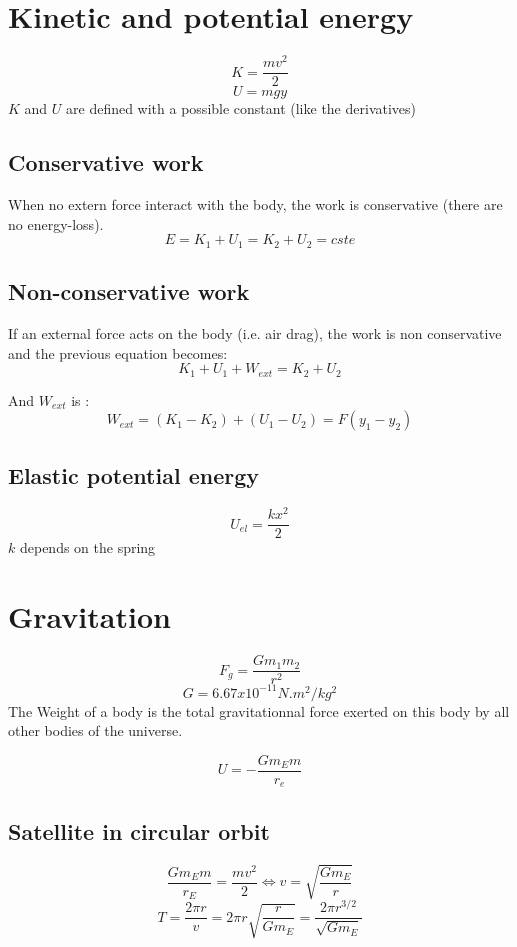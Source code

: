 \documentclass[a4paper,10pt]{article}
\begin{document}
\section{Kinetic and potential energy}
\[K = \frac{mv^2}{2}\]
\[U = mgy\]
$K$ and $U$ are defined with a possible constant (like the derivatives)

\subsection{Conservative work}
When no extern force interact with the body, the work is conservative (there are no energy-loss).
\[E = K_1 + U_1 = K_2 + U_2 = cste \]

\subsection{Non-conservative work}
If an external force acts on the body (i.e. air drag), the work is non conservative and the previous equation becomes:
\[K_1 + U_1 + W_{ext} = K_2 + U_2\]

And $W_{ext}$ is :
\[W_{ext} = (K_1 - K_2) + (U_1 - U_2) = F(y_1 - y_2)\]

\subsection{Elastic potential energy}
\[U_{el} = \frac{kx^2}{2}\]
$k$ depends on the spring

\section{Gravitation}
\[F_g = \frac{Gm_1m_2}{r^2}\]
\[G = 6.67x10^{-11} N.m^2/kg^2\]
The Weight of a body is the total gravitationnal force exerted on this body by all other bodies of the universe.

\[U = -\frac{Gm_Em}{r_e}\]

\subsection{Satellite in circular orbit}
\[ \frac{Gm_Em}{r_E} = \frac{mv^2}{2} \Leftrightarrow v = \sqrt{\frac{Gm_E}{r}} \]
\[T = \frac{2\pi r}{v} = 2\pi r \sqrt{\frac{r}{Gm_E}} = \frac{2\pi r^{3/2}}{\sqrt{Gm_E}}\]

\end{document}
